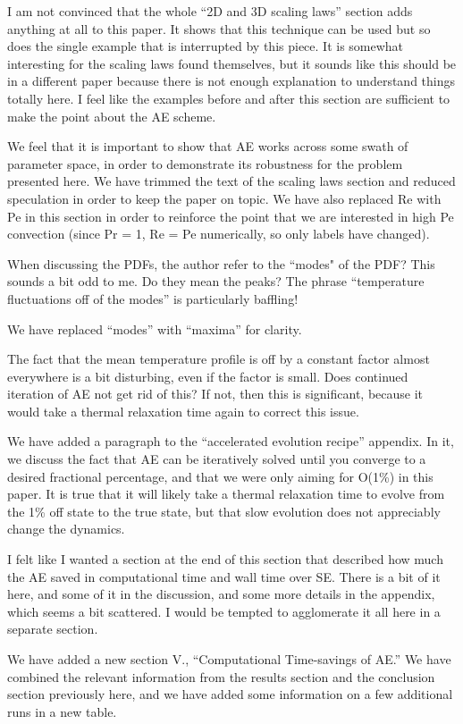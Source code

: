 \documentclass[aps, 11pt, singlecolumn]{revtex4-1} %
\begin{document}
\begin{singlespace}
\begin{myquotation}
I am not convinced that the whole ``2D and 3D scaling laws'' section
adds anything at all to this paper. It shows that this technique can
be used but so does the single example that is interrupted by this
piece. It is somewhat interesting for the scaling laws found
themselves, but it sounds like this should be in a different paper
because there is not enough explanation to understand things totally
here. I feel like the examples before and after this section are
sufficient to make the point about the AE scheme.
\end{myquotation}
We feel that it is important to show that AE works across some swath of parameter
space, in order to demonstrate its robustness for the problem presented here.
We have trimmed the text of the scaling laws section and reduced speculation in
order to keep the paper on topic. We have also replaced Re with Pe in this
section in order to reinforce the point that we are interested in high Pe
convection (since Pr = 1, Re = Pe numerically, so only labels have changed).

\begin{myquotation}
When discussing the PDFs, the author refer to the ``modes" of the PDF?
This sounds a bit odd to me. Do they mean the peaks? The phrase
``temperature fluctuations off of the modes'' is particularly baffling!
\end{myquotation}
We have replaced ``modes'' with ``maxima'' for clarity.

\begin{myquotation}
The fact that the mean temperature profile is off by a constant factor
almost everywhere is a bit disturbing, even if the factor is small.
Does continued iteration of AE not get rid of this? If not, then this
is significant, because it would take a thermal relaxation time again
to correct this issue.
\end{myquotation}
We have added a paragraph to the ``accelerated evolution recipe'' appendix.
In it, we discuss the fact that AE can be iteratively solved until you converge
to a desired fractional percentage, and that we were only aiming for O(1\%) in this
paper.  It is true that it will likely take a thermal relaxation time to evolve 
from the 1\% off state to the true state, but that slow evolution does not
appreciably change the dynamics.

\begin{myquotation}
I felt like I wanted a section at the end of this section that
described how much the AE saved in computational time and wall time
over SE. There is a bit of it here, and some of it in the discussion,
and some more details in the appendix, which seems a bit scattered. I
would be tempted to agglomerate it all here in a separate section.
\end{myquotation}
We have added a new section V., ``Computational Time-savings of AE.''
We have combined the relevant information from the results section and the 
conclusion section previously here, and we have added some information on a few
additional runs in a new table. 


\end{singlespace}
\end{document}
